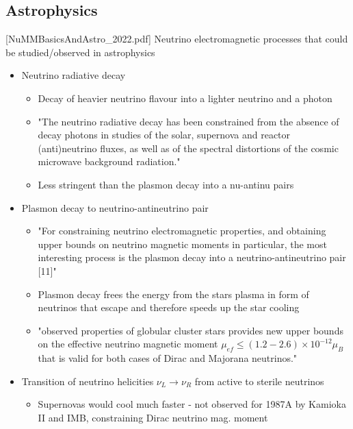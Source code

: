 \subsection{Astrophysics}
[NuMMBasicsAndAstro\_2022.pdf]
Neutrino electromagnetic processes that could be studied/observed in astrophysics
\begin{itemize}
\item Neutrino radiative decay
\begin{itemize}
\item Decay of heavier neutrino flavour into a lighter neutrino and a photon
\item "The neutrino radiative decay has been constrained from the absence of decay photons in studies of the solar, supernova and reactor (anti)neutrino fluxes, as well as of the spectral distortions of the cosmic microwave background radiation."
\item Less stringent than the plasmon decay into a nu-antinu pairs
\end{itemize}
\item Plasmon decay to neutrino-antineutrino pair
\begin{itemize}
\item "For constraining neutrino electromagnetic properties, and obtaining upper bounds on neutrino magnetic moments in particular, the most interesting process is the plasmon decay into a neutrino-antineutrino pair [11]"
\item Plasmon decay frees the energy from the stars plasma in form of neutrinos that escape and therefore speeds up the star cooling
\item "observed properties of globular cluster stars provides new upper bounds on the effective neutrino magnetic moment $\mu_{ef}\leq\left(1.2-2.6\right)\times 10^{-12}\mu_B$ that is valid for both cases of Dirac and Majorana neutrinos."
\end{itemize}
\item Transition of neutrino helicities $\nu_L\rightarrow\nu_R$ from active to sterile neutrinos
\begin{itemize}
\item Supernovas would cool much faster - not observed for 1987A by Kamioka II and IMB, constraining Dirac neutrino mag. moment
\end{itemize}
\end{itemize}
